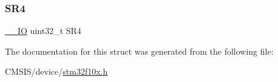 \subsubsection{\texorpdfstring{SR4}{SR4}}
{\footnotesize\ttfamily \mbox{\hyperlink{core__sc300_8h_aec43007d9998a0a0e01faede4133d6be}{\+\_\+\+\_\+\+IO}} uint32\+\_\+t S\+R4}



The documentation for this struct was generated from the following file\+:\begin{DoxyCompactItemize}
\item 
C\+M\+S\+I\+S/device/\mbox{\hyperlink{stm32f10x_8h}{stm32f10x.\+h}}\end{DoxyCompactItemize}
